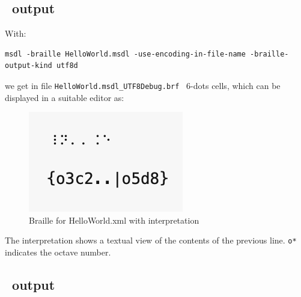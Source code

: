   \subsection{\braille\ output}

With:
\begin{lstlisting}[language=Terminal]
msdl -braille HelloWorld.msdl -use-encoding-in-file-name -braille-output-kind utf8d
\end{lstlisting}

we get in file {\tt HelloWorld.msdl_UTF8Debug.brf} \braille\ 6-dots cells, which can be displayed in a suitable editor as:
\begin{figure}[htbp]
\begin{center}
\includegraphics{../graphics/BrailleForHelloWorld.xmlWithInterpretation.png}

\caption{Braille for HelloWorld.xml with interpretation}
\label{Braille for HelloWorld.xml with interpretation}
\end{center}
\end{figure}

The interpretation shows a textual view of the contents of the previous line. {\tt o*} indicates the octave number.

  \subsection{\mxml\ output}

